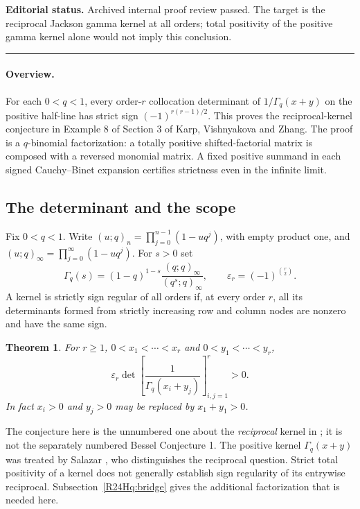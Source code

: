 \documentclass[11pt,a4paper]{article}
\newtheorem{SourceRceHqtheorem}{Theorem}
\begin{document}
\noindent\textbf{Editorial status.} Archived internal proof review passed. The target is the reciprocal Jackson gamma kernel at all orders; total positivity of the positive gamma kernel alone would not imply this conclusion.

\smallskip\hrule\medskip



\begingroup
\newcommand{\epsr}{\varepsilon_r}
\setcounter{equation}{0}
\renewcommand{\theequation}{\thesection.\arabic{equation}}
\renewcommand{\theHequation}{R24Hq.\arabic{equation}}
\paragraph{Overview.}
For each $0<q<1$, every order-$r$ collocation determinant of
$1/\Gamma_q(x+y)$ on the positive half-line has strict sign
$(-1)^{r(r-1)/2}$. This proves the reciprocal-kernel conjecture in
Example 8 of Section 3 of Karp, Vishnyakova and Zhang. The proof is a
$q$-binomial factorization: a totally positive shifted-factorial matrix
is composed with a reversed monomial matrix. A fixed positive summand
in each signed Cauchy--Binet expansion certifies strictness even in
the infinite limit.


\subsection{The determinant and the scope}
Fix $0<q<1$. Write $(u;q)_n=\prod_{j=0}^{n-1}(1-uq^j)$, with empty product
one, and $(u;q)_\infty=\prod_{j=0}^\infty(1-uq^j)$. For $s>0$ set
\[
 \Gamma_q(s)=(1-q)^{1-s}\frac{(q;q)_\infty}{(q^s;q)_\infty},
 \qquad \epsr=(-1)^{\binom r2}.
\]
A kernel is strictly sign regular of all orders if, at every order $r$,
all its determinants formed from strictly increasing row and column nodes
are nonzero and have the same sign.
\begin{SourceRceHqtheorem}\label{R24Hq:main}
For $r\ge1$, $0<x_1<\cdots<x_r$ and $0<y_1<\cdots<y_r$,
\[
 \epsr\det\left[\frac{1}{\Gamma_q(x_i+y_j)}\right]_{i,j=1}^r>0 .
\]
In fact $x_i>0$ and $y_j>0$ may be replaced by $x_1+y_1>0$.
\end{SourceRceHqtheorem}
The conjecture here is the unnumbered one about the \emph{reciprocal}
kernel in \cite[Section 3]{R24Hq:KVZ}; it is not the separately numbered
Bessel Conjecture 1. The positive kernel $\Gamma_q(x+y)$ was treated
by Salazar \cite{R24Hq:S}, who distinguishes the reciprocal question. Strict
total positivity of a kernel does not generally establish sign
regularity of its entrywise reciprocal. Subsection~\ref{R24Hq:bridge} gives the
additional factorization that is needed here.
\end{document}
